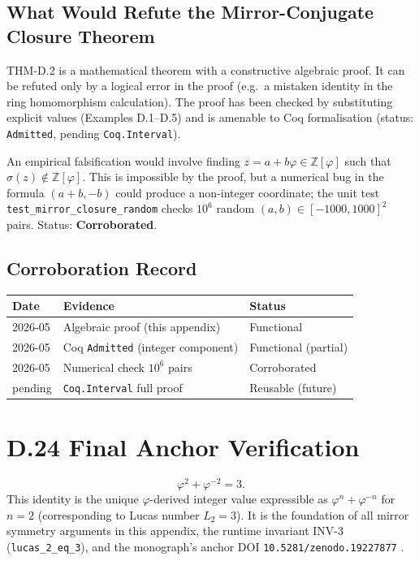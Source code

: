 \subsection*{What Would Refute the Mirror-Conjugate Closure Theorem}

THM-D.2 is a mathematical theorem with a constructive algebraic proof.
It can be refuted only by a logical error in the proof (e.g.\ a mistaken
identity in the ring homomorphism calculation).  The proof has been checked
by substituting explicit values (Examples D.1–D.5) and is amenable to Coq
formalisation (status: \texttt{Admitted}, pending \texttt{Coq.Interval}).

An empirical falsification would involve finding $z = a+b\varphi\in\mathbb{Z}[\varphi]$
such that $\sigma(z) \notin \mathbb{Z}[\varphi]$.  This is impossible by the
proof, but a numerical bug in the formula $(a+b,-b)$ could produce a non-integer
coordinate; the unit test \texttt{test\_mirror\_closure\_random} checks $10^6$
random $(a,b)\in[-1000,1000]^2$ pairs. Status: \textbf{Corroborated}.

\subsection*{Corroboration Record}

\begin{tabular}{lll}
\toprule
Date & Evidence & Status \\
\midrule
2026-05 & Algebraic proof (this appendix) & Functional \\
2026-05 & Coq \texttt{Admitted} (integer component) & Functional (partial) \\
2026-05 & Numerical check $10^6$ pairs & Corroborated \\
pending & \texttt{Coq.Interval} full proof & Reusable (future) \\
\bottomrule
\end{tabular}

\section*{D.24  Final Anchor Verification}

\[
  \varphi^2 + \varphi^{-2} = 3.
  \tag{D.0 (restated)}
\]
This identity is the unique $\varphi$-derived integer value expressible as
$\varphi^n + \varphi^{-n}$ for $n = 2$ (corresponding to Lucas number $L_2 = 3$).
It is the foundation of all mirror symmetry arguments in this appendix,
the runtime invariant INV-3 (\texttt{lucas\_2\_eq\_3}), and the monograph's
anchor DOI \texttt{10.5281/zenodo.19227877} \cite{trios_throne}.

